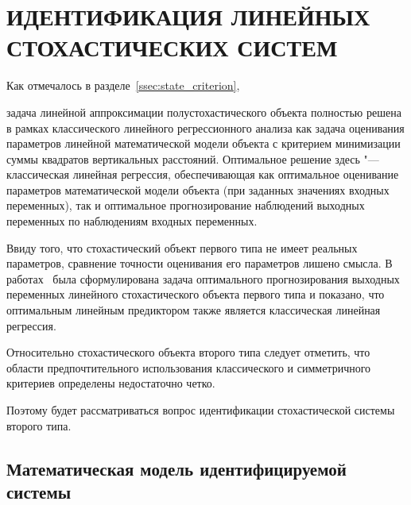 \chapter[Идентификация линейных стохастических систем второго типа]{%
  ИДЕНТИФИКАЦИЯ ЛИНЕЙНЫХ СТОХАСТИЧЕСКИХ СИСТЕМ
}

Как отмечалось в разделе~\ref{ssec:state_criterion},
{\color{red}
  задача линейной аппроксимации полустохастического объекта полностью решена в
  рамках классического линейного регрессионного анализа как задача оценивания параметров
  линейной математической модели объекта с критерием минимизации суммы квадратов вертикальных расстояний.
  Оптимальное решение здесь "--- классическая линейная регрессия,
  обеспечивающая как оптимальное оценивание параметров математической модели объекта
  (при заданных значениях входных переменных),
  так и оптимальное прогнозирование наблюдений выходных переменных по наблюдениям входных переменных.

  Ввиду того, что стохастический объект первого типа не имеет реальных параметров,
  сравнение точности оценивания его параметров лишено смысла.
  В работах~\cite{mukha_2010, mukha_2011} была сформулирована задача оптимального прогнозирования
  выходных переменных линейного стохастического объекта первого типа и показано,
  что оптимальным линейным предиктором также является классическая линейная регрессия.

  Относительно стохастического объекта второго типа следует отметить,
  что области предпочтительного использования классического и симметричного критериев
  определены недостаточно четко.
}
Поэтому будет рассматриваться вопрос идентификации стохастической системы второго типа.

\section{Математическая модель идентифицируемой системы}

